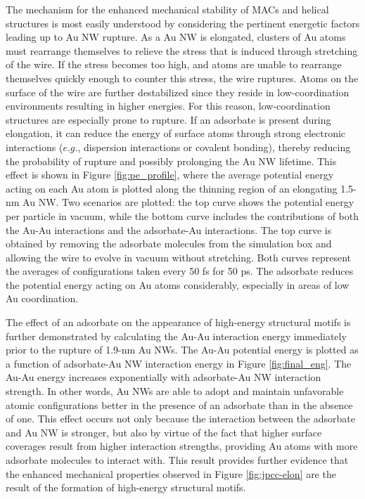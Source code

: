 \documentclass[10pt]{report}  %
\newcommand\findent{\hspace*{\parindent}}
\begin{document}
\findent The mechanism for the enhanced mechanical stability of MACs and helical structures is most easily understood by considering the pertinent energetic factors leading up to Au NW rupture.  As a Au NW is elongated, clusters of Au atoms must rearrange themselves to relieve the stress that is induced through stretching of the wire.  If the stress becomes too high, and atoms are unable to rearrange themselves quickly enough to counter this stress, the wire ruptures.  Atoms on the surface of the wire are further destabilized since they reside in low-coordination environments resulting in higher energies. For this reason, low-coordination structures are especially prone to rupture.  If an adsorbate is present during elongation, it can reduce the energy of surface atoms through strong electronic interactions ($e.g.$, dispersion interactions or covalent bonding), thereby reducing the probability of rupture and possibly prolonging the Au NW lifetime.  This effect is shown in Figure \ref{fig:pe_profile}, where the average potential energy acting on each Au atom is plotted along the thinning region of an elongating 1.5-nm Au NW.  Two scenarios are plotted: the top curve shows the potential energy per particle in vacuum, while the bottom curve includes the contributions of both the Au-Au interactions and the adsorbate-Au interactions.  The top curve is obtained by removing the adsorbate molecules from the simulation box and allowing the wire to evolve in vacuum without stretching.  Both curves represent the averages of configurations taken every 50 fs for 50 ps.  The adsorbate reduces the potential energy acting on Au atoms considerably, especially in areas of low Au coordination.       

The effect of an adsorbate on the appearance of high-energy structural motifs is further demonstrated by calculating the Au-Au interaction energy immediately prior to the rupture of 1.9-nm Au NWs.  The Au-Au potential energy is plotted as a function of adsorbate-Au NW interaction energy in Figure \ref{fig:final_eng}.  The Au-Au energy increases exponentially with adsorbate-Au NW interaction strength.  In other words, Au NWs are able to adopt and maintain unfavorable atomic configurations better in the presence of an adsorbate than in the absence of one.  This effect occurs not only because the interaction between the adsorbate and Au NW is stronger, but also by virtue of the fact that higher surface coverages result from higher interaction strengths, providing Au atoms with more adsorbate molecules to interact with.  This result provides further evidence that the enhanced mechanical properties observed in Figure \ref{fig:jpcc-elon} are the result of the formation of high-energy structural motifs.
\end{document}
